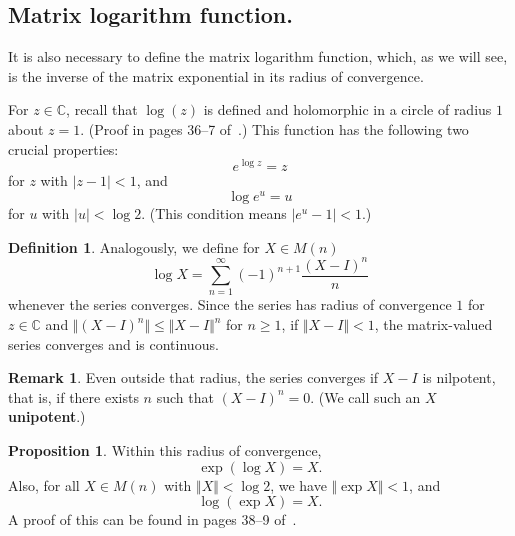 \documentclass[12pt]{article}
\newcommand{\C}{\mathbb{C}}
\newcommand{\V}{\Vert}
\theoremstyle{definition}
\newtheorem{prop}[them]{Proposition}
\theoremstyle{definition}
\theoremstyle{definition}
\theoremstyle{definition}
\newtheorem{rmk}[them]{Remark}
\theoremstyle{definition}
\newtheorem{defn}[them]{Definition}
\theoremstyle{definition}
\theoremstyle{definition}
\theoremstyle{definition}
\begin{document}
\subsection{Matrix logarithm function.}

\par{It is also necessary to define the matrix logarithm function, which, as we will see, is the inverse of the matrix exponential in its radius of convergence.}

\vspace{6pt}
\par{For $z \in \C$, recall that $\log(z)$ is
defined and holomorphic in a circle of radius $1$
about $z = 1$. (Proof in pages 36--7 of~\cite{Hall}.) This
function has the following two crucial properties:
\[
    e^{\log z} = z
\] 
for $z$ with $\vert z - 1 \vert < 1$, and
\[
    \log e^u = u
\] 
for $u$ with $\vert u \vert < \log2$. (This condition means $\vert e^u - 1\vert < 1$.)
}

\begin{defn}\label{def:log}
Analogously, we define for $X \in M(n)$
\[
    \log X = \sum_{n=1}^{\infty}{(-1)}^{n+1}\frac{{(X-I)}^n}{n}
\] 
whenever the series converges. Since the series
has radius of convergence $1$ for $z \in \C$ and
$\V {(X-I)}^n \V \leq \V X-I \V^n$ for $n \geq 1$,
if $\V X - I \V < 1$, the matrix-valued series
converges and is continuous. 
\end{defn}

\begin{rmk}
Even outside that radius, the series converges if
$X-I$ is nilpotent, that is, if there exists $n$
such that ${(X-I)}^n = 0$. (We call such an $X$
\textbf{unipotent}.)
\end{rmk}

\begin{prop}\label{prop:explog}
Within this radius of convergence,
\[
    \exp(\log X) = X.
\] 
Also, for all $X \in M(n)$ with $\V X \V < \log 2$,
we have $\V \exp X \V < 1$, and
\[
    \log(\exp X) = X.
\] 
A proof of this can be found in pages 38--9 of~\cite{Hall}.
\end{prop}
\end{document}
